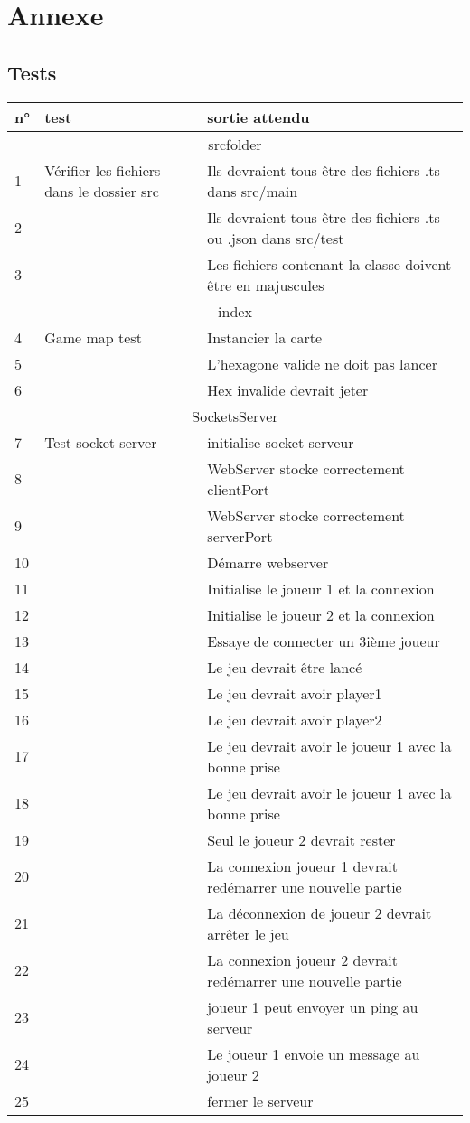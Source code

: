 \section{Annexe}

\subsection{Tests}
\newpage

\begin{center}
   \begin{tabular}{|l|l|l|}
  \hline
  
  n° & test & sortie attendu \\ \hline
  \multicolumn{3}{|c|}{srcfolder} \\
  \hline
  1 & Vérifier les fichiers dans le dossier src & Ils devraient tous être des fichiers .ts dans src/main\\  
  2 && Ils devraient tous être des fichiers .ts  ou  .json dans src/test \\
  3 && Les fichiers contenant la classe doivent être en majuscules \\
  \hline
  \multicolumn{3}{|c|}{index} \\
  \hline
  4 & Game map test & Instancier la carte\\
  5 && L'hexagone valide ne doit pas lancer \\
  6 && Hex invalide devrait jeter \\
  \hline
  \multicolumn{3}{|c|}{SocketsServer} \\
  \hline
  7 & Test socket server & initialise socket serveur\\
  8 && WebServer stocke correctement clientPort\\
  9 && WebServer stocke correctement serverPort\\
  10 && Démarre webserver\\
  11 && Initialise le joueur 1 et la connexion\\
  12 && Initialise le joueur 2 et la connexion \\
  13 && Essaye de connecter un 3ième joueur\\
  14 && Le jeu devrait être lancé \\
  15 && Le jeu devrait avoir player1\\
  16 && Le jeu devrait avoir player2\\
  17 && Le jeu devrait avoir le joueur 1 avec la bonne prise\\
  18 && Le jeu devrait avoir le joueur 1 avec la bonne prise\\
  19 && Seul le joueur 2 devrait rester \\
  20 && La connexion joueur 1 devrait redémarrer une nouvelle partie\\
  21 && La déconnexion de joueur 2 devrait arrêter le jeu\\
  22 && La connexion joueur 2 devrait redémarrer une nouvelle partie\\
  23 && joueur 1 peut envoyer un ping au serveur\\
  24 && Le joueur 1 envoie un message au joueur 2\\
  25 && fermer le serveur\\
  

\end{tabular}
\end{center}
